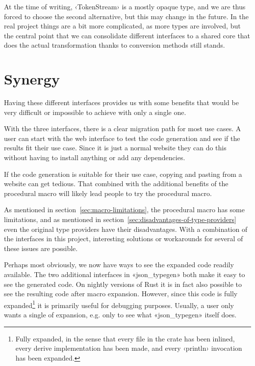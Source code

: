 At the time of writing, ‹TokenStream› is a mostly opaque type, and we are thus forced to choose the second alternative, but this may change in the future. In the real project things are a bit more complicated, as more types are involved, but the central point that we can consolidate different interfaces to a shared core that does the actual transformation thanks to conversion methods still stands.

\section{Synergy}

Having these different interfaces provides us with some benefits that would be very difficult or impossible to achieve with only a single one.

With the three interfaces, there is a clear migration path for most use cases. A user can start with the web interface to test the code generation and see if the results fit their use case. Since it is just a normal website they can do this without having to install anything or add any dependencies.

If the code generation is suitable for their use case, copying and pasting from a website can get tedious. That combined with the additional benefits of the procedural macro will likely lead people to try the procedural macro.

As mentioned in section~\ref{sec:macro-limitations}, the procedural macro has some limitations, and as mentioned in section~\ref{sec:disadvantages-of-type-providers} even the original type providers have their disadvantages. With a combination of the interfaces in this project, interesting solutions or workarounds for several of these issues are possible.


Perhaps most obviously, we now have ways to see the expanded code readily available. The two additional interfaces in «json_typegen» both make it easy to see the generated code. On nightly versions of Rust it is in fact also possible to see the resulting code after macro expansion. However, since this code is fully expanded\footnote{Fully expanded, in the sense that every file in the crate has been inlined, every derive implementation has been made, and every ‹println› invocation has been expanded.} it is primarily useful for debugging purposes. Usually, a user only wants a single  of expansion, e.g. only to see what «json_typegen» itself does.

